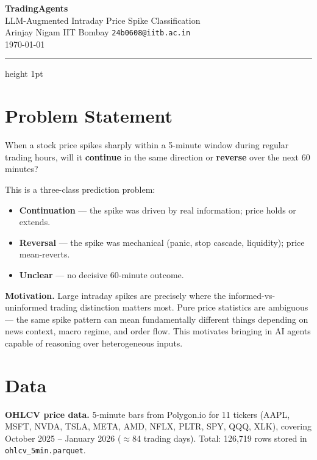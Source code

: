 \documentclass[11pt, a4paper]{article}
\begin{document}
\begin{center}
    {\LARGE \textbf{TradingAgents}}\\[4pt]
    {\large LLM-Augmented Intraday Price Spike Classification}\\[6pt]
    {\normalsize Arinjay Nigam \quad IIT Bombay \quad \texttt{24b0608@iitb.ac.in}}\\[2pt]
    {\small \today}
\end{center}

\hrule height 1pt
\vspace{8pt}

\section{Problem Statement}

When a stock price spikes sharply within a 5-minute window during regular trading hours, will it \textbf{continue} in the same direction or \textbf{reverse} over the next 60 minutes?

This is a three-class prediction problem:
\begin{itemize}[leftmargin=1.5em, itemsep=2pt]
    \item \textbf{Continuation} — the spike was driven by real information; price holds or extends.
    \item \textbf{Reversal} — the spike was mechanical (panic, stop cascade, liquidity); price mean-reverts.
    \item \textbf{Unclear} — no decisive 60-minute outcome.
\end{itemize}

\textbf{Motivation.}  Large intraday spikes are precisely where the informed-vs-uninformed trading distinction matters most. Pure price statistics are ambiguous — the same spike pattern can mean fundamentally different things depending on news context, macro regime, and order flow. This motivates bringing in AI agents capable of reasoning over heterogeneous inputs.

\section{Data}

\textbf{OHLCV price data.} 5-minute bars from Polygon.io for 11 tickers (AAPL, MSFT, NVDA, TSLA, META, AMD, NFLX, PLTR, SPY, QQQ, XLK), covering October 2025 -- January 2026 ($\approx$84 trading days). Total: 126,719 rows stored in \texttt{ohlcv\_5min.parquet}.
\end{document}
